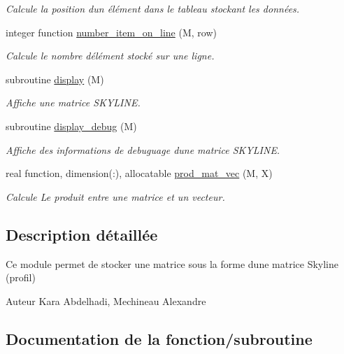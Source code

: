 \begin{DoxyCompactItemize}
\begin{DoxyCompactList}\small\item\em Calcule la position d\textquotesingle{}un élément dans le tableau stockant les données. \end{DoxyCompactList}\item 
integer function \hyperlink{namespaceskyline_a9f07218be321c12bea1d84f6b629e346}{number\+\_\+item\+\_\+on\+\_\+line} (M, row)
\begin{DoxyCompactList}\small\item\em Calcule le nombre d\textquotesingle{}élément stocké sur une ligne. \end{DoxyCompactList}\item 
subroutine \hyperlink{namespaceskyline_a428818245223fbf6e3a5a2264f8f1a65}{display} (M)
\begin{DoxyCompactList}\small\item\em Affiche une matrice S\+K\+Y\+L\+I\+NE. \end{DoxyCompactList}\item 
subroutine \hyperlink{namespaceskyline_aedb0d55aecd5f4cae4dc3593a5e89f0f}{display\+\_\+debug} (M)
\begin{DoxyCompactList}\small\item\em Affiche des informations de debuguage d\textquotesingle{}une matrice S\+K\+Y\+L\+I\+NE. \end{DoxyCompactList}\item 
real function, dimension(\+:), allocatable \hyperlink{namespaceskyline_ae156a973c4a30bd2740af6ef2fdfa1d9}{prod\+\_\+mat\+\_\+vec} (M, X)
\begin{DoxyCompactList}\small\item\em Calcule Le produit entre une matrice et un vecteur. \end{DoxyCompactList}\end{DoxyCompactItemize}


\subsection{Description détaillée}
Ce module permet de stocker une matrice sous la forme d\textquotesingle{}une matrice Skyline (profil) 

\begin{DoxyAuthor}{Auteur}
Kara Abdelhadi, Mechineau Alexandre 
\end{DoxyAuthor}


\subsection{Documentation de la fonction/subroutine}
\mbox{\label{namespaceskyline_a5fe1d351df2e3a07f96028d1d2a892a8}} 
